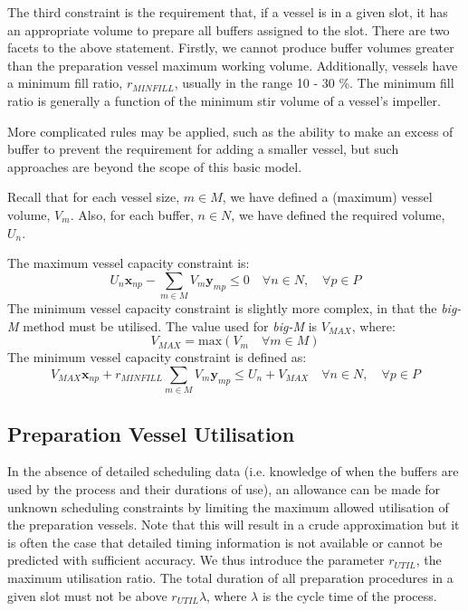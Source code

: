 The third constraint is the requirement that, if a vessel is in a given slot,
it has an appropriate volume to prepare all buffers assigned to the slot.
There are two facets to the above statement.
Firstly, we cannot produce buffer volumes greater than the preparation vessel
maximum working volume.
Additionally, vessels have a minimum fill ratio, $r_{MINFILL}$, usually in the
range 10 - 30 \%.
The minimum fill ratio is generally a function of the minimum stir volume of a
vessel's impeller.

More complicated rules may be applied, such as the ability to make an excess
of buffer to prevent the requirement for adding a smaller vessel, but such
approaches are beyond the scope of this basic model.

Recall that for each vessel size, $m \in M$, we have defined a (maximum) vessel
volume, $V_{m}$. Also, for each buffer, $n \in N$, we have defined the required
volume, $U_{n}$.

The maximum vessel capacity constraint is:
\begin{equation}
    U_{n} \boldsymbol{x}_{np} - \sum_{m \in M} V_{m} \boldsymbol{y}_{mp} \le 0
    \quad \forall n \in N, \quad \forall p \in P
    \label{eq.constr3a}
\end{equation}
The minimum vessel capacity constraint is slightly more complex, in that the
\emph{big-M} method must be utilised. The value used for \emph{big-M} is
$V_{\mathit{MAX}}$, where:
\begin{equation}
    V_{\mathit{MAX}} = \text{max} \left( V_{m} \quad \forall m \in M \right)
\end{equation}
The minimum vessel capacity constraint is defined as:
\begin{equation}
    V_{\mathit{MAX}} \boldsymbol{x}_{np} + r_{\mathit{MINFILL}} \sum_{m \in M}
    V_{m} \boldsymbol{y}_{mp} \le U_{n} + V_{\mathit{MAX}} \quad \forall n \in
    N, \quad \forall p \in P
    \label{eq.constr3b}
\end{equation}

\subsection{Preparation Vessel Utilisation}\label{SS.constr4}

In the absence of detailed scheduling data (i.e. knowledge of when the buffers
are used by the process and their durations of use), an allowance can be made
for unknown scheduling constraints by limiting the maximum allowed utilisation
of the preparation vessels.
Note that this will result in a crude approximation but it is often the case
that detailed timing information is not available or cannot be predicted with
sufficient accuracy.
We thus introduce the parameter $r_{\mathit{UTIL}}$, the maximum utilisation
ratio.
The total duration of all preparation procedures in a given slot must not be
above $r_{\mathit{UTIL}} \lambda$, where $\lambda$ is the cycle time of the
process.

